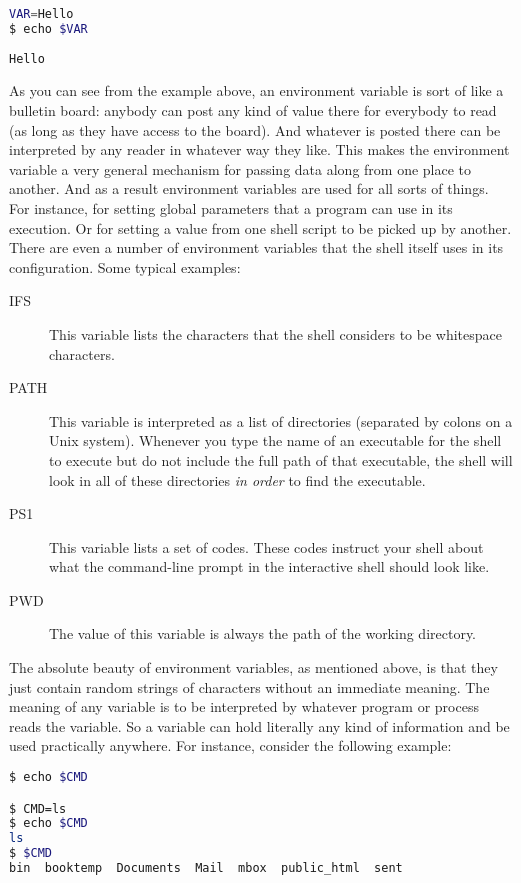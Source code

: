 \lstset{basicstyle=\scriptsize, numbers=left, captionpos=b, tabsize=4}
\begin{lstlisting}[caption=Simple use of a variable,language={bash},
xleftmargin=15pt, label=lst:simpleuseofavariable]
VAR=Hello
$ echo $VAR
\end{lstlisting}

\scriptsize
\begin{verbatim}
Hello
\end{verbatim}
\normalsize
As you can see from the example above, an environment variable is sort of like
a bulletin board: anybody can post any kind of value there for everybody to
read (as long as they have access to the board). And whatever is posted there
can be interpreted by any reader in whatever way they like. This makes the
environment variable a very general mechanism for passing data along from one
place to another. And as a result environment variables are used for all sorts
of things. For instance, for setting global parameters that a program can use
in its execution. Or for setting a value from one shell script to be picked up
by another. There are even a number of environment variables that the shell
itself uses in its configuration. Some typical examples:

\begin{description}
\item[IFS]This variable lists the characters that the shell considers to be whitespace characters.
\item[PATH]This variable is interpreted as a list of directories (separated by colons on a Unix system). Whenever you type the name of an executable for the shell to execute but do not include the full path of that executable, the shell will look in all of these directories \textit{in order} to find the executable.
\item[PS1]This variable lists a set of codes. These codes instruct your shell about what the command-line prompt in the interactive shell should look like.
\item[PWD]The value of this variable is always the path of the working directory.
\end{description}

The absolute beauty of environment variables, as mentioned above, is that they
just contain random strings of characters without an immediate meaning. The
meaning of any variable is to be interpreted by whatever program or process
reads the variable. So a variable can hold literally any kind of information
and be used practically anywhere. For instance, consider the following example:
\lstset{basicstyle=\scriptsize, numbers=left, captionpos=b, tabsize=4}
\begin{lstlisting}[caption=Environment variables are more flexible than you thought...,language={bash},
xleftmargin=15pt, label=lst:environmentvariables]
$ echo $CMD

$ CMD=ls
$ echo $CMD
ls
$ $CMD
bin  booktemp  Documents  Mail  mbox  public_html  sent
\end{lstlisting}

